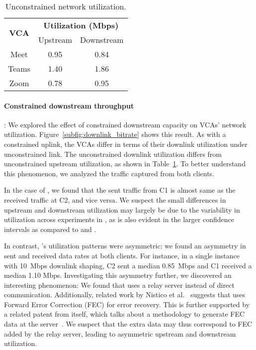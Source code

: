\begin{table}[t]
\centering
\begin{tabular}{|c|c|c|}
\hline
\multirow{2}{*}{\textbf{VCA}} & 
    \multicolumn{2}{c|}{{\bf Utilization (Mbps)}} \\ 
    \cline{2-3} 
                              & Upstream                   & Downstream                  \\ \hline
Meet                          & 0.95                     & 0.84                      \\ 
Teams                         & 1.40                      & 1.86                      \\ 
Zoom                          & 0.78                     & 0.95                      \\ \hline
\end{tabular}
\caption{Unconstrained network utilization.}
\label{tab:vca_static}
\end{table}





\paragraph{Constrained downstream throughput}: We explored the effect of constrained
downstream capacity
on VCAs' network utilization. Figure~\ref{subfig:downlink_bitrate} shows this
result.
As with a constrained uplink, the VCAs differ in terms of their downlink
utilization under unconstrained link. The unconstrained downlink utilization
differs from unconstrained upstream utilization, as shown in
Table~\ref{tab:vca_static}. To better understand this phenomenon, we analyzed the traffic
captured from both clients. 

In the case of \teams, we found that the sent traffic from C1
is almost same as the received traffic at C2, and vice versa. 
We suspect the small
differences in upstream and downstream utilization may largely be due to the
variability in utilization across experiments in \teams, as is
also evident in the larger confidence intervals as compared to \zoom and \meet. 

In contrast, \zoom's utilization patterns were asymmetric: we found an
asymmetry in sent and received data rates at both clients. For instance, in a
single instance with 10~Mbps downlink shaping, C2 sent a median 0.85~Mbps and
C1 received a median 1.10 Mbps. Investigating this asymmetry further, we
discovered an interesting phenomenon: We found that \zoom uses a relay server
instead of direct communication. Additionally, related work by Nistico et
al.~\cite{nistico2020comparative} suggests that \zoom uses Forward Error
Correction (FEC) for error recovery. This is further supported by a related
patent from \zoom itself, which talks about a methodology to generate FEC data
at the server~\cite{liu2019error}. We suspect that the extra data may thus
correspond to FEC added by the relay server, leading to asymmetric upstream and
downstream utilization.  

